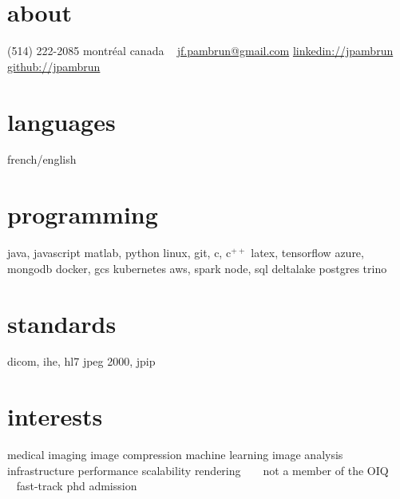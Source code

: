 \documentclass[print]{friggeri-cv}
\begin{document}

\newcommand{\eletr}{\href{http://www.etsmtl.ca/Programmes-Etudes/1er-cycle/Fiche-de-cours?Sigle=ELE747}{ele{\footnotesize747}}}
\newcommand{\eleenv}{\href{http://www.etsmtl.ca/Programmes-Etudes/1er-cycle/Fiche-de-cours?Sigle=ELE116}{ele{\footnotesize116}}}
\newcommand{\infmat}{\href{http://www.polymtl.ca/etudes/cours/details.php?sigle=INF1005a}{inf{\footnotesize1005}a}}
\newcommand{\gtssys}{\href{http://www.etsmtl.ca/Futurs-etudiants/Cycles-sup/Fiche-de-cours?Sigle=GTS840}{gts{\footnotesize840}}}

\begin{aside}
  \section{about}
  {\small(514) 222-2085}
  montréal
  canada
  ~
  \href{mailto:jf.pambrun@gmail.com}{jf.pambrun@gmail.com}
  \href{https://ca.linkedin.com/in/jpambrun}{linkedin://jpambrun}
  \href{http://github.com/jpambrun}{github://jpambrun}
  \section{languages}
  french/english
  \section{programming}
  java, javascript
  matlab, python
  linux, git, c, c{\tiny$^{++}$}
  latex, tensorflow
  azure, mongodb
  docker, gcs
  kubernetes
  aws, spark
  node, sql
  deltalake
  postgres
  trino
  \section{standards}
  dicom, ihe, hl{\small7}
  jpeg {\small2000}, jpip
  \section{interests}
  medical imaging
  image compression
  machine learning
  image analysis
  infrastructure
  performance
  scalability
  rendering
  ~\vspace{2cm}
  {\footnotesize\textdagger~ not a member of the OIQ\\\textdaggerdbl~ fast-track phd admission}
\end{aside}
\end{document}
